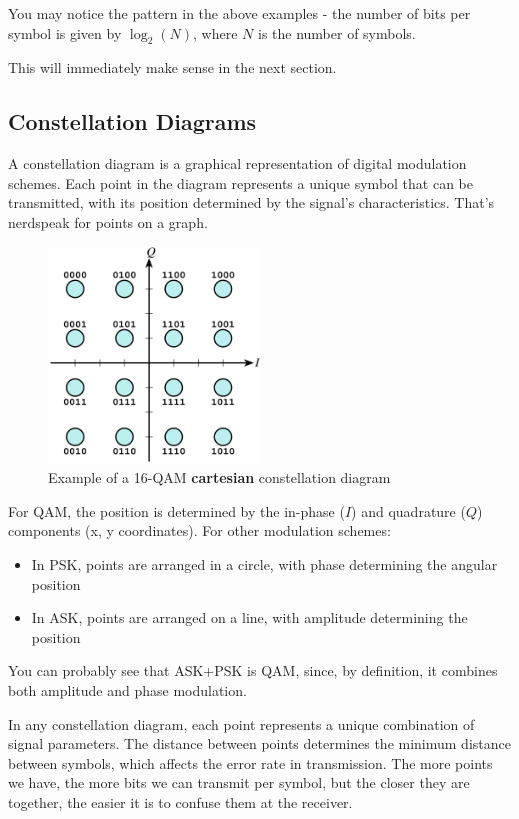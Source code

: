 You may notice the pattern in the above examples - the number of bits per symbol is given by $\log_2(N)$, where $N$ is the number of symbols.

This will immediately make sense in the next section.
\subsection{Constellation Diagrams}
A constellation diagram is a graphical representation of digital modulation schemes. Each point in the diagram represents a unique symbol that can be transmitted, with its position determined by the signal's characteristics. That's nerdspeak for points on a graph.

\begin{figure}[h]
    \centering
    \includegraphics[width=0.5\textwidth]{assets/osi/physical/signals/qam.png}
    \caption{Example of a 16-QAM \textbf{cartesian} constellation diagram}\label{fig:qam_constellation}
\end{figure}


For QAM, the position is determined by the in-phase ($I$) and quadrature ($Q$) components (x, y coordinates). For other modulation schemes:
\begin{itemize}
    \item In PSK, points are arranged in a circle, with phase determining the angular position
    \item In ASK, points are arranged on a line, with amplitude determining the position
\end{itemize}

\begin{importantblock}
    You can probably see that ASK+PSK is QAM, since, by definition, it combines both amplitude and phase modulation.
\end{importantblock}

In any constellation diagram, each point represents a unique combination of signal parameters. The distance between points determines the minimum distance between symbols, which affects the error rate in transmission. The more points we have, the more bits we can transmit per symbol, but the closer they are together, the easier it is to confuse them at the receiver.

